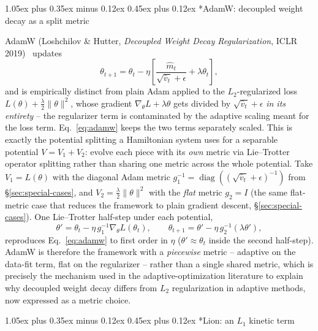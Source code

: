 \documentclass[10pt,twocolumn]{article}
\makeatletter
\renewcommand\subsection{\@startsection{subsection}{2}{0pt}%
  {1.05ex plus 0.35ex minus 0.12ex}%
  {0.45ex plus 0.12ex}%
  {\normalsize\bfseries}}
\makeatother
\begin{document}
\subsection*{AdamW: decoupled weight decay as a split metric}

AdamW (Loshchilov \& Hutter, \emph{Decoupled Weight Decay Regularization},
ICLR 2019)~\cite{loshchilov2019decoupled} updates
\begin{equation}
\theta_{t+1} = \theta_t - \eta\left[\frac{\hat m_t}{\sqrt{\hat v_t}+\epsilon} + \lambda\theta_t\right],
\label{eq:adamw}
\end{equation}
and is empirically distinct from plain Adam applied to the $L_2$-regularized
loss $L(\theta)+\tfrac{\lambda}{2}\|\theta\|^2$, whose gradient
$\nabla_\theta L + \lambda\theta$ gets divided by $\sqrt{\hat v_t}+\epsilon$
\emph{in its entirety} -- the regularizer term is contaminated by the adaptive
scaling meant for the loss term. Eq.~\eqref{eq:adamw} keeps the two terms
separately scaled. This is exactly the potential splitting a Hamiltonian
system uses for a separable potential $V=V_1+V_2$: evolve each piece with its
\emph{own} metric via Lie--Trotter operator splitting rather than sharing one
metric across the whole potential. Take $V_1=L(\theta)$ with the diagonal
Adam metric $g_1^{-1}=\operatorname{diag}((\sqrt{\hat v_t}+\epsilon)^{-1})$
from \S\ref{sec:special-cases}, and $V_2=\tfrac{\lambda}{2}\|\theta\|^2$ with
the \emph{flat} metric $g_2=I$ (the same flat-metric case that reduces the
framework to plain gradient descent, \S\ref{sec:special-cases}). One
Lie--Trotter half-step under each potential,
\begin{equation}
\theta' = \theta_t - \eta\, g_1^{-1}\nabla_\theta L(\theta_t),
\qquad
\theta_{t+1} = \theta' - \eta\, g_2^{-1}(\lambda\theta'),
\label{eq:adamw-split}
\end{equation}
reproduces Eq.~\eqref{eq:adamw} to first order in $\eta$ ($\theta'\approx\theta_t$
inside the second half-step). AdamW is therefore the framework with a
\emph{piecewise} metric -- adaptive on the data-fit term, flat on the
regularizer -- rather than a single shared metric, which is precisely the
mechanism used in the adaptive-optimization literature to explain why decoupled
weight decay differs from $L_2$ regularization in adaptive methods, now
expressed as a metric choice.

\subsection*{Lion: an $L_1$ kinetic term}
\end{document}
